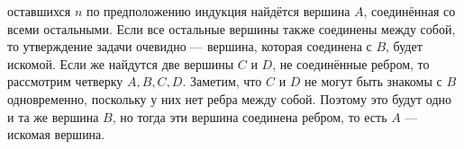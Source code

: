 \newpage

\hspace{3mm}

 оставшихся $n$ по предположению индукция найдётся вершина $A$, соединённая со всеми остальными. Если все остальные вершины также соединены между собой, то утверждение задачи очевидно --- вершина, которая соединена с $B$, будет искомой. Если же найдутся две вершины $C$ и $D$, не соединённые ребром, то рассмотрим четверку $A,B,C,D$. Заметим, что $C$ и $D$ не могут быть знакомы с $B$ одновременно, поскольку у них нет ребра между собой. Поэтому это будут одно и та же вершина $B$, но тогда эти вершина соединена ребром, то есть $A$ --- искомая вершина.

